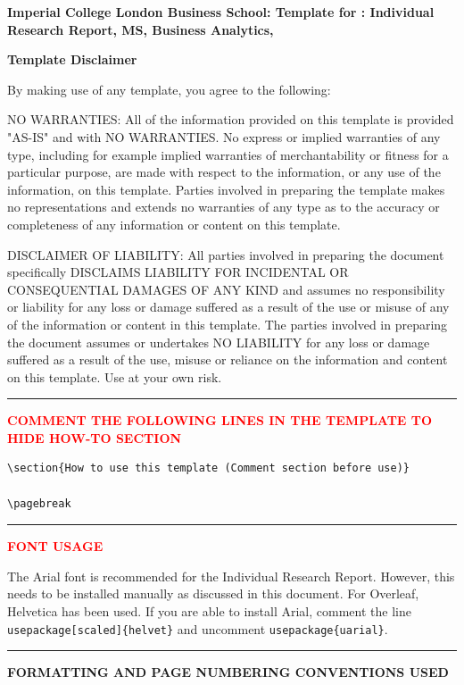 
\textbf{Imperial College London Business School: Template for : Individual Research Report, MS, Business Analytics, 
}

\textbf{Template Disclaimer}

By making use of any template, you agree to the following:

NO WARRANTIES: All of the information provided on this template is provided "AS-IS" and with NO WARRANTIES. No express or implied warranties of any type, including for example implied warranties of merchantability or fitness for a particular purpose, are made with respect to the information, or any use of the information, on this template. Parties involved in preparing the template makes no representations and extends no warranties of any type as to the accuracy or completeness of any information or content on this template.


DISCLAIMER OF LIABILITY: All parties involved in preparing the document specifically DISCLAIMS LIABILITY FOR INCIDENTAL OR CONSEQUENTIAL DAMAGES OF ANY KIND and assumes no responsibility or liability for any loss or damage suffered as a result of the use or misuse of any of the information or content in this template. The parties involved in preparing the document assumes or undertakes NO LIABILITY for any loss or damage suffered as a result of the use, misuse or reliance on the information and content on this template. Use at your own risk.

{\color{red} \rule{\linewidth}{0.5mm} }
\textcolor{red}{\textbf{COMMENT THE FOLLOWING LINES IN THE TEMPLATE TO HIDE HOW-TO SECTION}}
\begin{verbatim}
\section{How to use this template (Comment section before use)}

\pagebreak
\end{verbatim}
{\color{red} \rule{\linewidth}{0.5mm}}

\textcolor{red}{\textbf{FONT USAGE}}

The Arial font is recommended for the Individual Research Report. However, this needs to be installed manually as discussed in this document. For Overleaf, Helvetica has been used. If you are able to install Arial, comment the line \texttt{usepackage[scaled]\{helvet\}} and uncomment \texttt{usepackage\{uarial\}}.

{\color{red} \rule{\linewidth}{0.5mm}}

\textbf{FORMATTING AND PAGE NUMBERING CONVENTIONS USED}


